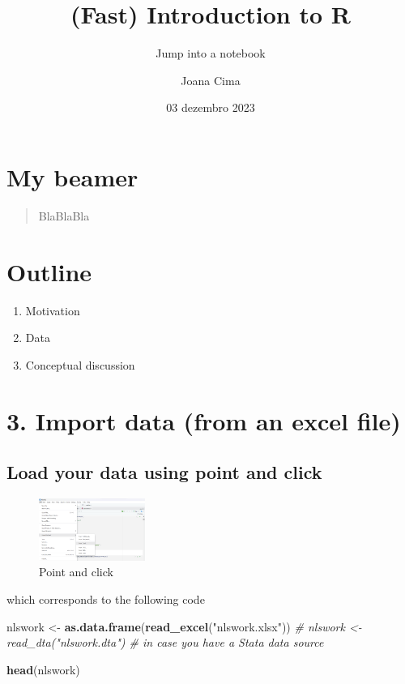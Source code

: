 \documentclass[
]{article}
\title{(Fast) Introduction to R}
\subtitle{Jump into a notebook}
\author{Joana Cima}
\date{03 dezembro 2023}
\newenvironment{Shaded}{\begin{snugshade}}{\end{snugshade}}
\newcommand{\CommentTok}[1]{\textcolor[rgb]{0.56,0.35,0.01}{\textit{#1}}}
\newcommand{\FunctionTok}[1]{\textcolor[rgb]{0.13,0.29,0.53}{\textbf{#1}}}
\newcommand{\NormalTok}[1]{#1}
\newcommand{\OtherTok}[1]{\textcolor[rgb]{0.56,0.35,0.01}{#1}}
\newcommand{\StringTok}[1]{\textcolor[rgb]{0.31,0.60,0.02}{#1}}
\providecommand{\tightlist}{%
  \setlength{\itemsep}{0pt}\setlength{\parskip}{0pt}}
\begin{document}
\maketitle

\hypertarget{my-beamer}{%
\section{My beamer}\label{my-beamer}}

\begin{quote}
BlaBlaBla
\end{quote}

\hypertarget{outline}{%
\section{Outline}\label{outline}}

\begin{enumerate}
\def\labelenumi{\arabic{enumi}.}
\tightlist
\item
  Motivation
\item
  Data
\item
  Conceptual discussion
\end{enumerate}

\hypertarget{import-data-from-an-excel-file}{%
\section{3. Import data (from an excel
file)}\label{import-data-from-an-excel-file}}

\hypertarget{load-your-data-using-point-and-click}{%
\subsection{Load your data using point and
click}\label{load-your-data-using-point-and-click}}

\begin{figure}
\centering
\includegraphics[width=0.31\textwidth,height=\textheight]{importdataset.png}
\caption{Point and click}
\end{figure}

which corresponds to the following code

\begin{Shaded}
\begin{Highlighting}[]
\NormalTok{nlswork }\OtherTok{\textless{}{-}} \FunctionTok{as.data.frame}\NormalTok{(}\FunctionTok{read\_excel}\NormalTok{(}\StringTok{"nlswork.xlsx"}\NormalTok{))}
\CommentTok{\# nlswork \textless{}{-} read\_dta("nlswork.dta") \# in case you have a Stata data source}

\FunctionTok{head}\NormalTok{(nlswork)}
\end{Highlighting}
\end{Shaded}
\end{document}

